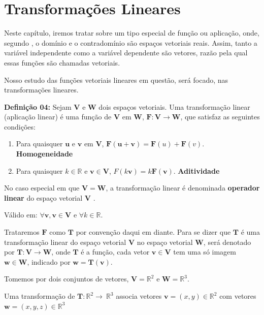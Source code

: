 \chapter{Transformações Lineares}
Neste capítulo, iremos tratar sobre um tipo especial de função ou aplicação, onde, segundo \cite{steinbruch1987}, o domínio e o contradomínio são espaços vetoriais reais. Assim, tanto a variável independente como a variável dependente são vetores, razão pela qual essas funções são chamadas vetoriais.

Nosso estudo das funções vetoriais lineares em questão, será focado, nas transformações lineares.

\noindent\textbf{Definição 04:} Sejam $\mathbf{V}$ e $\mathbf{W}$ dois espaços vetoriais. Uma transformação linear (aplicação linear) é uma função de $\mathbf{V}$ em $\mathbf{W}$, $\mathbf{F}: \mathbf{V} \rightarrow \mathbf{W}$, que satisfaz as seguintes condições:

\begin{enumerate}
	\item Para quaisquer $\mathbf{u}$ e $\mathbf{v}$ em $\mathbf{V}$, $\mathbf{F}(\mathbf{u} + \mathbf{v}) = \mathbf{F}(u) + \mathbf{F}(v)$. \textbf{Homogeneidade}
	\item Para quaisquer $k \in \mathbb{R}$ e $\mathbf{v} \in \mathbf{V}$, $F(k\mathbf{v}) = k\mathbf{F}(\mathbf{v})$. \textbf{Aditividade}
\end{enumerate}	

No caso especial em que $\mathbf{V} = \mathbf{W}$, a transformação linear é denominada \textbf{operador linear} do espaço vetorial $\mathbf{V}$ \cite{anton2010elementary}.

\noindent\centerline{Válido em: $\forall \mathbf{v}, \mathbf{v} \in \mathbf{V}$ e $\forall k \in \mathbb{R}$. }

Trataremos $\mathbf{F}$ como $\mathbf{T}$ por convenção daqui em diante. Para se dizer que $\mathbf{T}$ é uma transformação linear do espaço vetorial $\mathbf{V}$ no espaço vetorial $\mathbf{W}$, será denotado por $\mathbf{T}:\mathbf{V}\longrightarrow\mathbf{W}$, onde $\mathbf{T}$ é a função, cada vetor $\mathbf{v} \in \mathbf{V}$ tem uma só imagem $\mathbf{w} \in \mathbf{W}$, indicado por $\mathbf{w} = \mathbf{T}(\mathbf{v})$.

Tomemos por dois conjuntos de vetores, $\mathbf{V} = \mathbb{R}^2$ e $\mathbf{W} = \mathbb{R}^3$.

Uma transformação de $\mathbf{T}:\mathbb{R}^2\longrightarrow\ \mathbb{R}^3$ associa vetores $\mathbf{v} = (x, y) \in \mathbb{R}^2$ com vetores $\mathbf{w} = (x, y, z) \in \mathbb{R}^3$

